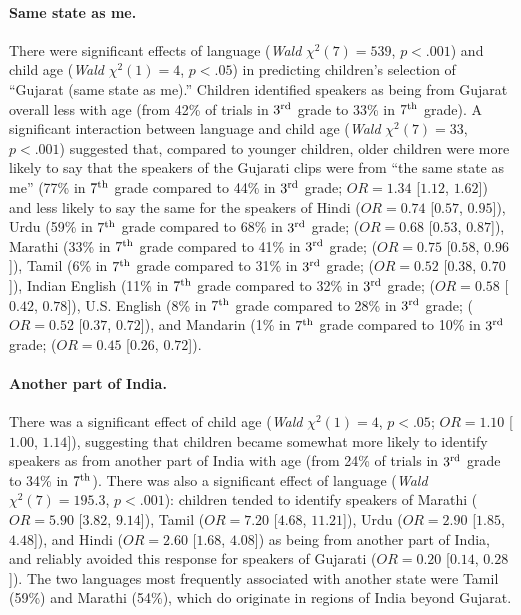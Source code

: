 \documentclass{foushee-adapted-preprint}
\begin{document}
\paragraph*{Same state as me.} 
There were significant effects of language (\textit{Wald} $\chi^2(7)=539$, $p<.001$) and child age (\textit{Wald} $\chi^2(1)=4$, $p<.05$) in predicting children's selection of ``Gujarat (same state as me).'' Children identified speakers as being from Gujarat overall less with age (from 42\% of trials in $3^{\textnormal{rd}}$ grade to 33\% in $7^{\textnormal{th}}$ grade). 
A significant interaction between language and child age (\textit{Wald} $\chi^2(7)=33$, $p<.001$) suggested that, compared to younger children, older children were more likely to say that the speakers of the Gujarati clips were from ``the same state as me'' (77\% in $7^{\textnormal{th}}$ grade compared to 44\% in $3^{\textnormal{rd}}$ grade; $OR=1.34$ [$1.12$, $1.62$]) and less likely to say the same for the speakers of Hindi %
($OR=0.74$ [$0.57$, $0.95$]), Urdu (59\% in $7^{\textnormal{th}}$ grade compared to 68\% in $3^{\textnormal{rd}}$ grade; 
($OR=0.68$ [$0.53$, $0.87$]), Marathi (33\% in $7^{\textnormal{th}}$ grade compared to 41\% in $3^{\textnormal{rd}}$ grade; 
($OR=0.75$ [$0.58$, $0.96$]), Tamil (6\% in $7^{\textnormal{th}}$ grade compared to 31\% in $3^{\textnormal{rd}}$ grade; 
($OR=0.52$ [$0.38$, $0.70$]), Indian English (11\% in $7^{\textnormal{th}}$ grade compared to 32\% in $3^{\textnormal{rd}}$ grade; 
($OR=0.58$ [$0.42$, $0.78$]), U.S. English (8\% in $7^{\textnormal{th}}$ grade compared to 28\% in $3^{\textnormal{rd}}$ grade; 
($OR=0.52$ [$0.37$, $0.72$]), and Mandarin (1\% in $7^{\textnormal{th}}$ grade compared to 10\% in $3^{\textnormal{rd}}$ grade; 
($OR=0.45$ [$0.26$, $0.72$]). 
\paragraph*{Another part of India.} 
There was a significant effect of child age (\textit{Wald} $\chi^2(1)=4$, $p<.05$; $OR=1.10$ [$1.00$, $1.14$]), suggesting that children became somewhat more likely to identify speakers as from another part of India with age (from 24\% of trials in $3^{\textnormal{rd}}$ grade to 34\% in $7^{\textnormal{th}}$). 
There was also a significant effect of language (\textit{Wald} $\chi^2(7)=195.3$, $p<.001$): children tended to identify speakers of Marathi ($OR=5.90$ [$3.82$, $9.14$]), Tamil ($OR=7.20$ [$4.68$, $11.21$]), Urdu ($OR=2.90$ [$1.85$, $4.48$]), and Hindi ($OR=2.60$ [$1.68$, $4.08$]) as being from another part of India, and reliably avoided this response for speakers of Gujarati ($OR=0.20$ [$0.14$, $0.28$]). %
The two languages most frequently associated with another state were Tamil (59\%) and Marathi (54\%), which do originate in regions of India beyond Gujarat.
\end{document}
